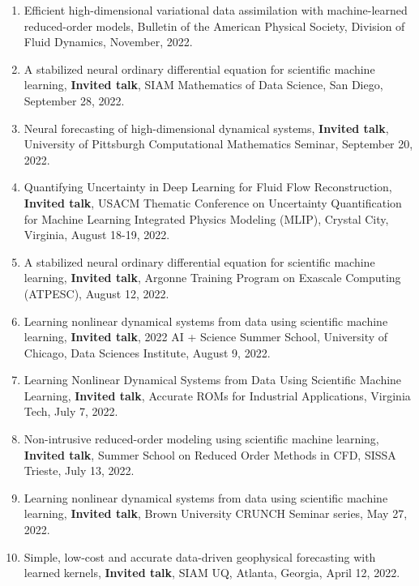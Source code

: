 \documentclass[letterpaper]{article}
\begin{document}
\begin{enumerate}
\item Efficient high-dimensional variational data assimilation with machine-learned reduced-order models, Bulletin of the American Physical Society, Division of Fluid Dynamics, November, 2022.

\item A stabilized neural ordinary differential equation for scientific machine learning, \textbf{Invited talk}, SIAM Mathematics of Data Science, San Diego, September 28, 2022.

\item Neural forecasting of high-dimensional dynamical systems, \textbf{Invited talk}, University of Pittsburgh Computational Mathematics Seminar, September 20, 2022.

\item Quantifying Uncertainty in Deep Learning for Fluid Flow Reconstruction, \textbf{Invited talk}, USACM Thematic Conference on Uncertainty Quantification for Machine Learning Integrated Physics Modeling (MLIP), Crystal City, Virginia, August 18-19, 2022.

\item A stabilized neural ordinary differential equation for scientific machine learning, \textbf{Invited talk}, Argonne Training Program on Exascale Computing (ATPESC), August 12, 2022.

\item Learning nonlinear dynamical systems from data using scientific machine learning, \textbf{Invited talk}, 2022 AI + Science Summer School, University of Chicago, Data Sciences Institute, August 9, 2022.

\item Learning Nonlinear Dynamical Systems from Data Using Scientific Machine Learning, \textbf{Invited talk}, Accurate ROMs for Industrial Applications, Virginia Tech, July 7, 2022.

\item Non-intrusive reduced-order modeling using scientific machine learning, \textbf{Invited talk}, Summer School on Reduced Order Methods in CFD, SISSA Trieste, July 13, 2022.

\item Learning nonlinear dynamical systems from data using scientific machine learning, \textbf{Invited talk}, Brown University CRUNCH Seminar series, May 27, 2022. 

\item Simple, low-cost and accurate data-driven geophysical forecasting with learned kernels, \textbf{Invited talk}, SIAM UQ, Atlanta, Georgia, April 12, 2022.


\end{enumerate}
\end{document}
